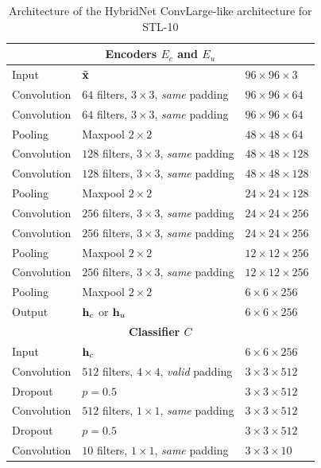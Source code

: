 \begin{table}[htbp]
\centering
\caption{Architecture of the HybridNet ConvLarge-like architecture for STL-10}
\label{hybridnetA:table:convlargestl}
\begin{threeparttable}
\setlength{\tabcolsep}{4pt}
\begin{tabular}{ l l l}
\toprule
\multicolumn{3}{c}{\textbf{Encoders $E_c$ and $E_u$}} \\
\midrule
Input & $\tilde{\mathbf{x}}$ & $96\times 96\times 3$ \\
Convolution & $64$ filters, $3\times3$, \textit{same} padding & $96\times 96\times 64$ \\
Convolution & $64$ filters, $3\times3$, \textit{same} padding & $96\times 96\times 64$ \\
Pooling   & Maxpool $2\times2$ & $48\times 48\times 64$ \\

Convolution & $128$ filters, $3\times3$, \textit{same} padding & $48\times 48\times 128$ \\
Convolution & $128$ filters, $3\times3$, \textit{same} padding & $48\times 48\times 128$ \\
Pooling   & Maxpool $2\times2$ & $24\times 24\times 128$ \\

Convolution & $256$ filters, $3\times3$, \textit{same} padding  & $24\times 24\times 256$ \\
Convolution & $256$ filters, $3\times3$, \textit{same} padding  & $24\times 24\times 256$ \\
Pooling   & Maxpool $2\times2$ & $12\times 12\times 256$ \\

Convolution & $256$ filters, $3\times3$, \textit{same} padding  & $12\times 12\times 256$ \\
Pooling & Maxpool $2\times2$  & $6\times 6\times 256$ \\

Output & $\mathbf{h}_c$ or $\mathbf{h}_u$ & $6\times 6\times 256$ \\

\toprule
\multicolumn{3}{c}{\textbf{Classifier $C$}}\\
\midrule
Input & $\mathbf{h}_c$& $6\times 6\times 256$ \\

Convolution & $512$ filters, $4\times4$, \textit{valid} padding  & $3\times 3\times 512$ \\
Dropout & $p=0.5$  & $3\times 3\times 512$ \\
Convolution & $512$ filters, $1\times1$, \textit{same} padding & $3\times 3\times 512$ \\
Dropout & $p=0.5$  & $3\times 3\times 512$ \\
Convolution & $10$ filters, $1\times1$, \textit{same} padding & $3\times 3\times 10$ \\


\end{tabular}
\end{threeparttable}
\end{table}
